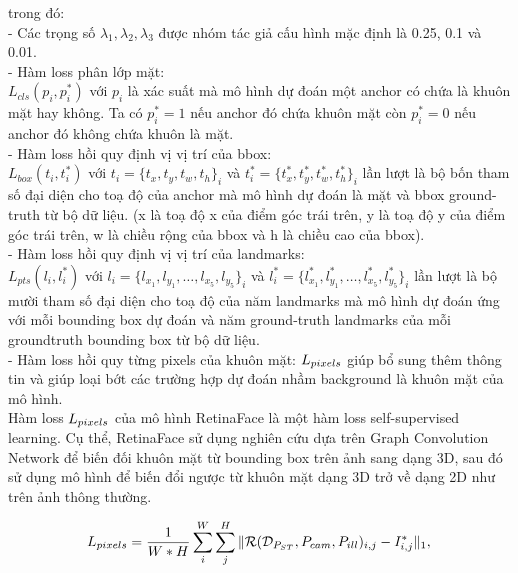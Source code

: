 {    \noindent
    trong đó: \\
    - Các trọng số $\lambda_1, \lambda_2, \lambda_3$ được nhóm tác giả cấu hình mặc định là 0.25, 0.1 và 0.01. \\
    - Hàm loss phân lớp mặt: \\
    $L_{cls}(p_i, p^{*}_i)$ với $p_i$ là xác suất mà mô hình dự đoán một anchor  có chứa là khuôn mặt hay không.
    Ta có $p^{*}_i = 1$ nếu anchor  đó chứa khuôn mặt còn $p^{*}_i = 0$ nếu anchor  đó không chứa khuôn là mặt. \\
    - Hàm loss hồi quy định vị vị trí của bbox: \\
    $L_{box}(t_i, t^{*}_i)$ với $t_i=\{t_x, t_y, t_w, t_h\}_i$ và $t^{*}_i=\{t^{*}_x, t^{*}_y, t^{*}_w, t^{*}_h\}_i$ lần lượt là bộ bốn tham số đại diện cho toạ độ của anchor  mà mô hình dự đoán là mặt và bbox ground-truth từ bộ dữ liệu.
    (x là toạ độ x của điểm góc trái trên, y là toạ độ y của điểm góc trái trên, w là chiều rộng của bbox và h là chiều cao của bbox). \\
    - Hàm loss hồi quy định vị vị trí của landmarks: \\
    $L_{pts} (l_i, l^{*}_i)$ với $l_i=\{l_{x_1}, l_{y_1}, \dots , l_{x_5}, l_{y_5}\}_i$ và $l^{*}_i=\{l^{*}_{x_1}, l^{*}_{y_1}, \dots , l^{*}_{x_5}, l^{*}_{y_5}\}_i$ lần lượt là bộ mười tham số đại diện cho toạ độ của năm landmarks mà mô hình dự đoán ứng với mỗi bounding box  dự đoán và năm ground-truth landmarks của mỗi groundtruth  bounding box  từ bộ dữ liệu. \\
    - Hàm loss hồi quy từng pixels  của khuôn mặt: $L_{pixels \index{pixels}}$ giúp bổ sung thêm thông tin và giúp loại bớt các trường hợp dự đoán nhầm background  là khuôn mặt của mô hình. \\
    Hàm loss $L_{pixels \index{pixels}}$ của mô hình RetinaFace là một hàm loss self-supervised learning.
    Cụ thể, RetinaFace sử dụng nghiên cứu \cite{zhou2019dense} dựa trên Graph Convolution Network để biến đối khuôn mặt từ bounding box  trên ảnh sang dạng 3D, sau đó sử dụng mô hình \cite{genova2018unsupervised} để biến đổi ngược từ khuôn mặt dạng 3D trở về dạng 2D như trên ảnh thông thường.

    \begin{equation}
        L_{pixels \index{pixels}}  = \frac{1}{W*H} \sum_{i}^{W} \sum_{j}^{H}  \|\mathcal{R}(\mathcal{D}_{P_{ST}},P_{cam},P_{ill})_{i,j} - I_{i,j}^*\|_1,\\
        \label{fig:retinaface_loss_pixel}
    \end{equation}

}
